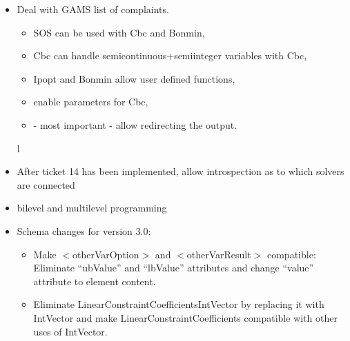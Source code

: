 \begin{itemize}

\item Deal with GAMS list of complaints.

\begin{itemize}
\item SOS can be used with Cbc and Bonmin,
\item Cbc can handle semicontinuous+semiinteger variables with Cbc, 
\item Ipopt and Bonmin allow user defined functions,
\item enable parameters for Cbc, 
\item - most important - allow redirecting the output.
\end{itemize}

%
%
%
l%
%
%
%
\item After ticket 14 has been implemented, allow introspection as to which solvers are connected 

\item bilevel and multilevel programming

\item Schema changes for version 3.0:

\begin{itemize}
\item Make $<$otherVarOption$>$ and $<$otherVarResult$>$ compatible: Eliminate ``ubValue'' and ``lbValue'' attributes and change ``value'' attribute to element content.

\item Eliminate LinearConstraintCoefficientsIntVector by replacing it with IntVector and make LinearConstraintCoefficients compatible with other uses of IntVector.

\end{itemize}

\end{itemize}

\fi
